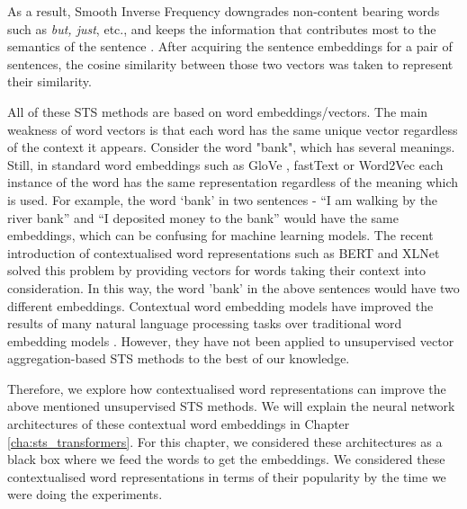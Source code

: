 As a result, Smooth Inverse Frequency downgrades non-content bearing words such as \emph{but, just}, etc., and keeps the information that contributes most to the semantics of the sentence \autocite{DBLP:conf/iclr/AroraLM17}. After acquiring the sentence embeddings for a pair of sentences, the cosine similarity between those two vectors was taken to represent their similarity. 

\noindent  All of these STS methods are based on word embeddings/vectors. The main weakness of word vectors is that each word has the same unique vector regardless of the context it appears. Consider the word "bank", which has several meanings. Still, in standard word embeddings such as GloVe \autocite{pennington-etal-2014-glove}, fastText \autocite{mikolov-etal-2018-advances} or Word2Vec  \autocite{10.5555/2999792.2999959} each instance of the word has the same representation regardless of the meaning which is used. For example, the word `bank' in two sentences - ``I am walking by the river bank'' and ``I deposited money to the bank'' would have the same embeddings, which can be confusing for machine learning models. The recent introduction of contextualised word representations such as BERT \autocite{devlin-etal-2019-bert} and XLNet \autocite{yang2019xlnet} solved this problem by providing vectors for words taking their context into consideration. In this way, the word 'bank' in the above sentences would have two different embeddings. Contextual word embedding models have improved the results of many natural language processing tasks over traditional word embedding models \autocite{peters-etal-2018-deep, devlin-etal-2019-bert}. However, they have not been applied to unsupervised vector aggregation-based STS methods to the best of our knowledge.


Therefore, we explore how contextualised word representations can improve the above mentioned unsupervised STS methods. We will explain the neural network architectures of these contextual word embeddings in Chapter \ref{cha:sts_transformers}. For this chapter, we considered these architectures as a black box where we feed the words to get the embeddings. We considered these contextualised word representations in terms of their popularity by the time we were doing the experiments.

